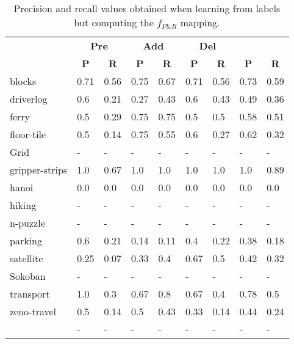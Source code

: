 \documentclass{article}
\begin{document}
\begin{table}
	\begin{center}
		\begin{scriptsize}
			\begin{tabular}{l|l|l|l|l|l|l||l|l|}
				& \multicolumn{2}{|c|}{\bf Pre} & \multicolumn{2}{|c|}{\bf Add} & \multicolumn{2}{|c||}{\bf Del} & \multicolumn{2}{|c}{\bf}\\ \cline{2-9}			
				& \multicolumn{1}{|c|}{\bf P} & \multicolumn{1}{|c|}{\bf R} & \multicolumn{1}{|c|}{\bf P} & \multicolumn{1}{|c|}{\bf R} & \multicolumn{1}{|c|}{\bf P} & \multicolumn{1}{|c||}{\bf R} &  \multicolumn{1}{|c|}{\bf P} & \multicolumn{1}{|c|}{\bf R} \\
				\hline
				blocks & 0.71 & 0.56 & 0.75 & 0.67 & 0.71 & 0.56 & 0.73 & 0.59 \\
				driverlog & 0.6 & 0.21 & 0.27 & 0.43 & 0.6 & 0.43 & 0.49 & 0.36 \\
				ferry & 0.5 & 0.29 & 0.75 & 0.75 & 0.5 & 0.5 & 0.58 & 0.51 \\
				floor-tile & 0.5 & 0.14 & 0.75 & 0.55 & 0.6 & 0.27 & 0.62 & 0.32 \\
				Grid & - & - & - & - & - & - & - & - \\ %
				gripper-strips & 1.0 & 0.67 & 1.0 & 1.0 & 1.0 & 1.0 & 1.0 & 0.89 \\
				hanoi & 0.0 & 0.0 & 0.0 & 0.0 & 0.0 & 0.0 & 0.0 & 0.0 \\
				hiking & - & - & - & - & - & - & - & - \\ %
				n-puzzle & - & - & - & - & - & - & - & - \\ %
				parking & 0.6 & 0.21 & 0.14 & 0.11 & 0.4 & 0.22 & 0.38 & 0.18 \\
				satellite & 0.25 & 0.07 & 0.33 & 0.4 & 0.67 & 0.5 & 0.42 & 0.32 \\
				Sokoban & - & - & - & - & - & - & - & - \\ %
				transport & 1.0 & 0.3 & 0.67 & 0.8 & 0.67 & 0.4 & 0.78 & 0.5 \\
				zeno-travel & 0.5 & 0.14 & 0.5 & 0.43 & 0.33 & 0.14 & 0.44 & 0.24 \\
				\hline
				\bf  & - & - & - & - & - & - & - & - \\
			\end{tabular}
		\end{scriptsize}
	\end{center}
	\caption{\small Precision and recall values obtained when learning from labels but computing the $f_{P\&R}$ mapping.}
	\label{fig:labels}
\end{table}
\end{document}
